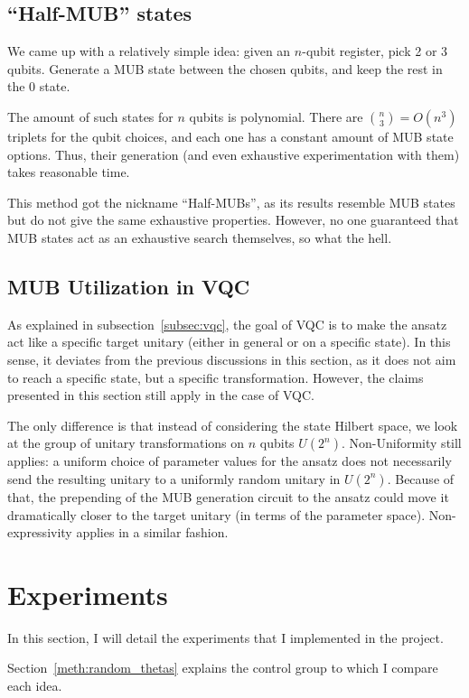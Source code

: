 \documentclass[a4paper,12pt]{article}
\begin{document}
\subsection{``Half-MUB'' states} \label{meth:half_mub}
We came up with a relatively simple idea: given an $n$-qubit register, pick 2 or 3 qubits. Generate a MUB state between the chosen qubits, and keep the rest in the 0 state.

The amount of such states for $n$ qubits is polynomial. There are ${n \choose 3} = O(n^3)$ triplets for the qubit choices, and each one has a constant amount of MUB state options.
Thus, their generation (and even exhaustive experimentation with them) takes reasonable time.

This method got the nickname ``Half-MUBs'', as its results resemble MUB states but do not give the same exhaustive properties.
However, no one guaranteed that MUB states act as an exhaustive search themselves, so what the hell.

\subsection{MUB Utilization in VQC} \label{subsec:mub_vqc}
As explained in subsection~\ref{subsec:vqc}, the goal of VQC is to make the ansatz act like a specific target unitary (either in general or on a specific state).
In this sense, it deviates from the previous discussions in this section, as it does not aim to reach a specific state, but a specific transformation.
However, the claims presented in this section still apply in the case of VQC.

The only difference is that instead of considering the state Hilbert space, we look at the group of unitary transformations on $n$ qubits $U(2^n)$.
Non-Uniformity still applies: a uniform choice of parameter values for the ansatz does not necessarily send the resulting unitary to a uniformly random unitary in $U(2^n)$.
Because of that, the prepending of the MUB generation circuit to the ansatz could move it dramatically closer to the target unitary (in terms of the parameter space).
Non-expressivity applies in a similar fashion.

\section{Experiments} \label{sec:experiments}
In this section, I will detail the experiments that I implemented in the project.

Section~\ref{meth:random_thetas} explains the control group to which I compare each idea.
\end{document}

